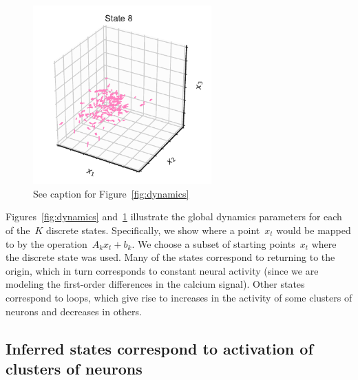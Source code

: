 \documentclass{article}
\begin{document}
\begin{figure}[h]
  \includegraphics[width=2.7in]{figures/arhmm/dynamics_123_7.pdf}
  \caption{See caption for Figure~\ref{fig:dynamics}}
  \label{fig:dynamics2}
\end{figure}
Figures~\ref{fig:dynamics} and~\ref{fig:dynamics2} illustrate the
global dynamics parameters for each of the~$K$ discrete states.
Specifically, we show where a point~$x_t$ would be mapped to by the
operation~$A_k x_t + b_k$.  We choose a subset of starting
points~$x_t$ where the discrete state was used. Many of the states
correspond to returning to the origin, which in turn corresponds to
constant neural activity (since we are modeling the first-order
differences in the calcium signal).  Other states correspond to loops,
which give rise to increases in the activity of some clusters of
neurons and decreases in others.

\clearpage

\subsection{Inferred states correspond to activation of clusters of neurons}
\end{document}
